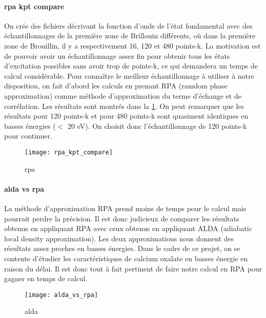 
\paragraph{rpa kpt compare}
On crée des fichiers décrivant la fonction d'onde de l'état fondamental avec des échantillonnages de la première zone de Brillouin différents, où dans la première zone de Brouillin, il y a respectivement 16, 120 et 480 points-k.
La motivation est de pouvoir avoir un échantillonnage assez fin pour obtenir tous les états d'excitation possibles sans avoir trop de points-k, ce qui demandera un temps de calcul considérable.
Pour connaître le meilleur échantillonnage à utiliser à notre disposition, on fait d'abord les calculs en prenant RPA (ramdom phase approximation) comme méthode d'approximation du terme d'échange et de corrélation.
Les résultats sont montrés dans la \cref{kptCompare}.
On peut remarquer que les résultats pour 120 points-k et pour 480 points-k sont quasiment identiques en basses énergies ($<$ 20 eV).
On choisit donc l'échantillonnage de 120 points-k pour continuer.

\begin{figure}[!h]\label{kptCompare}
    \centering
    \texttt{[image: rpa\_kpt\_compare]}
    \caption{rpa}
\end{figure}

\paragraph{alda vs rpa}\label{aldaRPA}
La méthode d'approximation RPA prend moins de temps pour le calcul mais pourrait perdre la précision. Il est donc judicieux de comparer les résultats obtenus en appliquant RPA avec ceux obtenus en appliquant ALDA (adiabatic local density approximation).
Les deux approximations nous donnent des résultats assez proches en basses énergies.
Dans le cadre de ce projet, on se contente d'étudier les caractéristiques de calcium oxalate en basses énergie en raison du délai.
Il est donc tout à fait pertinent de faire notre calcul en RPA pour gagner en temps de calcul.
\begin{figure}[!h]
    \centering
    \texttt{[image: alda\_vs\_rpa]}
    \caption{alda}
\end{figure}


